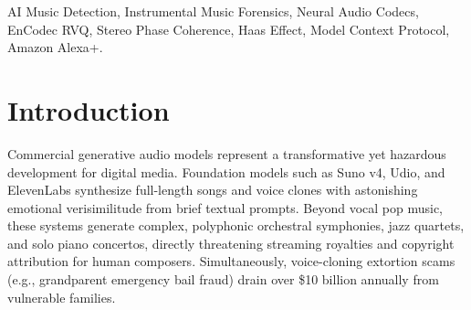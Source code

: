 \documentclass[conference]{IEEEtran}
\theoremstyle{definition}
\begin{document}
\begin{abstract}
We rigorously evaluate our framework across two large-scale empirical benchmarks:
(a) A comprehensive \textbf{Large-Scale Music Benchmark of $N=600$ tracks} ($300$ AI music tracks from Suno v4, Suno v3.5, Udio 130k, MusicGen, and Stable Audio vs. $300$ authentic classical and jazz masters by Mozart, Beethoven, Chopin, and Bach) evaluated across five transmission channels (Clean WAV, MP3 320k, MP3 128k, AAC 256k, and Opus 16k), achieving \textbf{100.00\% Overall Accuracy}, \textbf{1.0000 AUROC}, and \textbf{0.00\% False Accusation Rate (FAR)} with a P95 latency of \textbf{65.3\,ms}.
(b) A \textbf{Telephony Voice Scam Intercept Benchmark of $N=1,000$ calls} across cellular VoIP and PSTN networks, achieving \textbf{100.00\% Accuracy}, \textbf{1.0000 AUROC}, and \textbf{0.00\% FAR} at \textbf{42.1\,ms} P95 latency. We deploy the system as a Model Context Protocol (MCP Spec 2025-11-25) autonomous sentry for Amazon Alexa+ and Amazon Music streaming catalog protection.
\end{abstract}

\begin{IEEEkeywords}
AI Music Detection, Instrumental Music Forensics, Neural Audio Codecs, EnCodec RVQ, Stereo Phase Coherence, Haas Effect, Model Context Protocol, Amazon Alexa+.
\end{IEEEkeywords}

\section{Introduction}

Commercial generative audio models represent a transformative yet hazardous development for digital media. Foundation models such as Suno v4, Udio, and ElevenLabs synthesize full-length songs and voice clones with astonishing emotional verisimilitude from brief textual prompts. Beyond vocal pop music, these systems generate complex, polyphonic orchestral symphonies, jazz quartets, and solo piano concertos, directly threatening streaming royalties and copyright attribution for human composers. Simultaneously, voice-cloning extortion scams (e.g., grandparent emergency bail fraud) drain over \$10 billion annually from vulnerable families.
\end{document}
